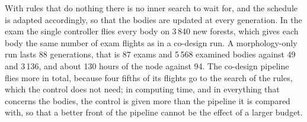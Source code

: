 With rules that do nothing there is no inner search to wait for, and the schedule is adapted accordingly, so that the bodies are updated at every generation. In the exam the single controller flies every body on 3\,840 new forests, which gives each body the same number of exam flights as in a co-design run. A morphology-only run lasts 88 generations, that is 87 exams and 5\,568 examined bodies against 49 and 3\,136, and about 130 hours of the node against 94. The co-design pipeline flies more in total, because four fifths of its flights go to the search of the rules, which the control does not need; in computing time, and in everything that concerns the bodies, the control is given more than the pipeline it is compared with, so that a better front of the pipeline cannot be the effect of a larger budget.
